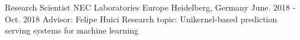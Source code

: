 \cventry
{Research Scientist} %
{NEC Laboratories Europe} %
{Heidelberg, Germany} %
{June. 2018 - Oct. 2018} %
{ %
Advisor: Felipe Huici\newline
Research topic: Unikernel-based prediction serving systems for machine learning
}
